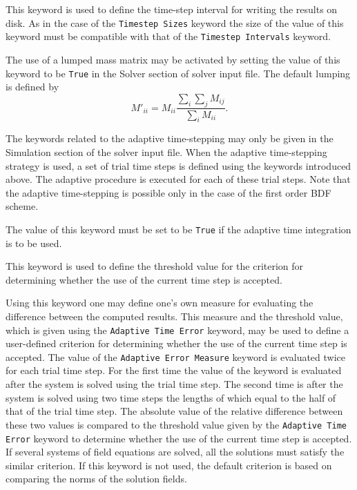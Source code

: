This keyword is used to define the time-step interval for writing the results on disk.
As in the case of the {\tt Timestep Sizes} keyword the size of the value of this keyword
must be compatible with that of the {\tt Timestep Intervals} keyword. 

The use of a lumped mass matrix may be activated by setting the value of this 
keyword to be {\tt True} in the Solver section of solver input file. 
The default lumping is defined by
\begin{equation}
M'_{ii} = M_{ii}\frac{\sum_i\sum_j M_{ij}}{\sum_i M_{ii}}.
\end{equation}
\sifend

\noindent
The keywords related to the adaptive time-stepping may only be given in the Simulation section
of the solver input file. When the adaptive time-stepping strategy is used, a set of trial 
time steps is defined using the keywords introduced above. 
The adaptive procedure is executed for each of these trial steps. Note that
the adaptive time-stepping is possible only in the case of the first order BDF scheme.

\sifbegin
{}
The value of this keyword must be set to be {\tt True} if 
the adaptive time integration is to be used.

This keyword is used to define the threshold value for the criterion for
determining whether the use of the current time step is accepted.

Using this keyword one may define one's own measure for evaluating the difference
between the computed results. This measure and the threshold value, which is
given using the {\tt Adaptive Time Error} keyword, may be used to define  
a user-defined criterion for determining whether the use of the current time step is 
accepted. The value of the {\tt Adaptive Error Measure}
keyword is evaluated twice for each trial time step. 
For the first time the value
of the keyword is evaluated after the system is solved using the trial time step. 
The second time is after the system is solved using two time steps the lengths of 
which equal to the half of that of the trial time step.
The absolute value of the relative difference between these two values
is compared to the threshold value given by the {\tt Adaptive Time Error} keyword
to determine whether the use of the current time step is 
accepted. If several systems of field equations are solved, all the solutions must
satisfy the similar criterion.
If this keyword is not used, the default criterion is based on comparing 
the norms of the solution fields. 

